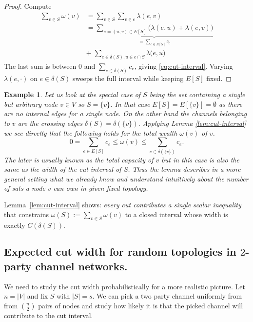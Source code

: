 \documentclass[10pt,twocolumn]{article}
\newtheorem{example}{Example}[theorem]
\begin{document}
\begin{proof}
Compute
\begin{equation}
  \begin{split}
\sum_{v\in S}\omega(v) & =\sum_{v\in S}\sum_{v\in e}\lambda(e,v) \\
& =\underbrace{\sum_{e=(u,v)\in E[S]}\big(\lambda(e,u)+\lambda(e,v)\big)}_{=\sum_{e\in E[S]}c_e} \\
& +
\;\sum_{e\in\delta(S),u\in e\cap S}\lambda\big(e,u)
\end{split}
  \end{equation}
The last sum is between $0$ and $\sum_{e\in\delta(S)}c_e$, giving \eqref{eq:cut-interval}. Varying $\lambda(e,\cdot)$ on
$e\in\delta(S)$ sweeps the full interval while keeping $E[S]$ fixed.
\end{proof}

\begin{example}
  Let us look at the special case of $S$ being the set containing a single but arbitrary node $v\in V$ so $S=\{v\}$. In that case $E[S] = E[\{v\}]  = \emptyset$ as there are no internal edges for a single node. On the other hand the channels belonging to $v$ are the crossing edges $\delta(S) = \delta(\{v\})$. Applying Lemma \ref{lem:cut-interval} we see directly that the following holds for the total wealth $\omega(v)$ of $v$.
  \begin{equation}
    0 = \sum_{e\in E[S]}c_e \leq \omega(v) \leq \sum_{e\in\delta(\{v\})}c_e.
    \end{equation}
  The later is usually known as the total capacity of $v$ but in this case is also the same as the width of the cut interval of $S$. Thus the lemma describes in a more general setting what we already know and understand intuitively about the number of sats a node $v$ can own in given fixed topology.
  \end{example}

Lemma~\ref{lem:cut-interval} shows: \emph{every cut contributes a single scalar inequality} that constrains $\omega(S):=\sum_{v\in S}\omega(v)$ to a closed interval whose width is exactly $C(\delta(S))$.

\subsection{Expected cut width for random topologies in $2$-party channel networks.}
We need to study the cut width probabilistically for a more realistic picture.
Let $n=|V|$ and fix $S$ with $|S|=s$. We can pick a two party channel uniformly from from $\binom{n}{2}$ pairs of nodes and study how likely it is that the picked channel will contribute to the cut interval.
\end{document}
